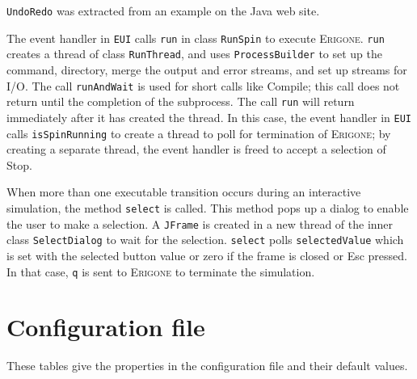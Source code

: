 \documentclass[11pt]{article}
\newcommand{\eri}{\textsc{Erigone}}
\newcommand{\p}[1]{\texttt{#1}}
\newcommand{\bu}[1]{\textsf{#1}}
\begin{document}
\p{UndoRedo} was extracted from an example on the Java web site.

The event handler in \p{EUI} calls \p{run} in class \p{RunSpin} to
execute \eri{}. \p{run} creates a thread of class \p{RunThread}, and
uses \p{ProcessBuilder} to set up the command, directory, merge the
output and error streams, and set up streams for I/O. The call
\p{runAndWait} is used for short calls like \bu{Compile}; this call does
not return until the completion of the subprocess. The call \p{run} will
return immediately after it has created the thread. In this case, the
event handler in \p{EUI} calls \p{isSpinRunning} to create a thread to
poll for termination of \eri{}; by creating a separate thread, the event
handler is freed to accept a selection of \bu{Stop}.

When more than one executable transition occurs during an interactive
simulation, the method \p{select} is called. This method pops up a
dialog to enable the user to make a selection. A \p{JFrame} is created
in a new thread of the inner class \p{SelectDialog} to wait for the
selection. \p{select} polls \p{selectedValue} which is set with the
selected button value or zero if the frame is closed or \bu{Esc}
pressed. In that case, \p{q} is sent to \eri{} to terminate the
simulation.

\newpage

\appendix

\section{Configuration file}\label{a.cfg}

These tables give the properties in the configuration file and their
default values.
\end{document}
